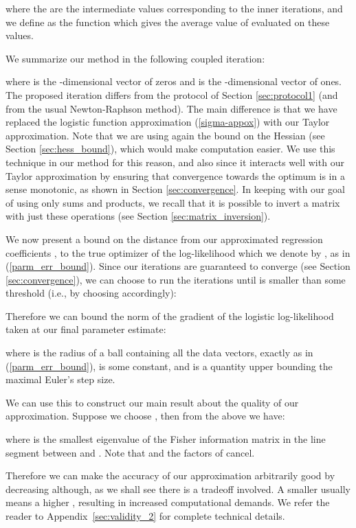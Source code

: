 \documentclass[11pt]{article}
\begin{document}
where the  are the intermediate values corresponding to the inner iterations, and we define  as the function which gives the average value of  evaluated on these values.

We summarize our method  in the following coupled iteration:

where  is the -dimensional vector of zeros and  is the -dimensional vector of ones.
The proposed iteration differs from the protocol of Section \ref{sec:protocol1} (and from the usual Newton-Raphson method).  The main difference is that we have replaced the logistic function approximation (\ref{sigma-appox}) with our Taylor approximation. Note that we are using again the bound on the Hessian (see Section \ref{sec:hess_bound}), which would make computation easier. We use this technique in our method for this reason, and also since it interacts well with our Taylor approximation by ensuring that convergence towards the optimum is in a sense monotonic, as shown in Section \ref{sec:convergence}.  In keeping with our goal of using only sums and products, we recall that it is possible to invert a matrix with just these operations (see Section \ref{sec:matrix_inversion}).



We now present a bound on the distance from our approximated regression coefficients , to the true optimizer of the log-likelihood which we denote by , as in (\ref{parm_err_bound}).
Since our iterations are guaranteed to converge (see Section \ref{sec:convergence}), we can choose to run the iterations until  is smaller than some threshold  (i.e., by choosing  accordingly):


Therefore we can bound the norm of the gradient of the logistic log-likelihood taken at our final parameter estimate:

where  is the radius of a ball containing all the data vectors, exactly as in (\ref{parm_err_bound}),  is some constant, and  is a quantity upper bounding the maximal Euler's step size.

We can use this to construct our main result about the quality of our approximation.  Suppose we choose , then from the above we have:

where  is the smallest eigenvalue of the Fisher information matrix  in the line segment between  and .  Note that  and  the factors of  cancel.

Therefore we can make the accuracy of our approximation arbitrarily good by decreasing  although, as we shall see there is a tradeoff involved.  A smaller  usually means a higher , resulting in increased computational demands. We refer the reader to Appendix~\ref{sec:validity_2} for complete technical details.
\end{document}
